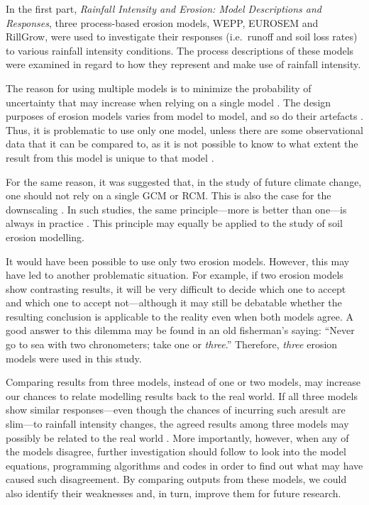 
In the first part, \textsl{Rainfall Intensity and Erosion: Model Descriptions
and Responses}, three process-based erosion models, WEPP, EUROSEM and RillGrow,
were used to investigate their responses (i.e.\ runoff and soil loss rates) to
various rainfall intensity conditions. The process descriptions of these models
were examined in regard to how they represent and make use of rainfall
intensity.

The reason for using multiple models is to minimize the probability of
uncertainty that may increase when relying on a single model
\citep{ipcc2001-881}. The design purposes of erosion models varies from
model to
model, and so do their artefacts \citep{favis-mortlock1998-141,jetten1999-521}.
Thus, it is problematic to use only one model, unless there are some
observational data that it can be compared to, as it is not possible to know to
what extent the result from this model is unique to that model
\citep{favis-mortlock1998-141,jetten1999-521}.

For the same reason, it was suggested that, in the study of future climate
change, one should not rely on a single GCM or RCM. This is also the case for
the downscaling \citep{mearns2003,wilby2004}. In such studies, the same
principle---more is better than one---is always in practice \citep{wilby2004}.
This principle may equally be applied to the study of soil erosion modelling.

It would have been possible to use only two erosion models. However, this may
have led to another problematic situation. For example, if two erosion models
show contrasting results, it will be very difficult to decide which one to
accept and which one to accept not---although it may still be debatable
whether the resulting conclusion is applicable to the reality even when both
models agree. A good answer to this dilemma may be found in an old fisherman's
saying: ``Never go to sea with two chronometers; take one or \emph{three}.''
Therefore, \emph{three} erosion models were used in this study.

Comparing results from three models, instead of one or two models, may increase
our chances to relate modelling results back to the real world.
If all three models show similar responses---even though the chances of
incurring such aresult are slim---to rainfall intensity changes, the agreed
results among three models may possibly be related to the real world
\citep{araujo2007-42}.
More importantly, however, when any of the models disagree, further
investigation should follow to look into the model equations, programming
algorithms and codes in order to find out what may have caused such
disagreement. By comparing outputs from these models, we could also identify
their weaknesses and, in turn, improve them for future research.

